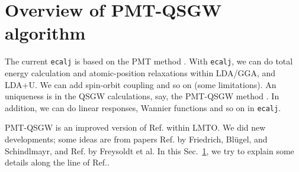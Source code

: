 \documentclass[a4paper,10pt,epsf,fleqn]{article}
\begin{document}


\newpage
\section{Overview of PMT-QSGW algorithm}
\label{sec:theory}
The current {\tt ecalj} is based on the PMT method
\cite{kotani2015pmt,kotani_linearized_2013,pmt1}.
With {\tt ecalj}, we can do total energy calculation and 
atomic-position relaxations within LDA/GGA, and LDA+U.
We can add spin-orbit coupling and so on (some limitations).
An uniqueness is in the QSGW calculations, say, the PMT-QSGW method
\cite{kotani_quasiparticle_2014}. 
In addition, we can do linear responses, Wannier functions and 
so on in {\tt ecalj}.

PMT-QSGW is an improved version of 
Ref.\cite{kotani_quasiparticle_2007} within LMTO.
We did new developments; some ideas are from papers
Ref.\cite{friedrich_efficient_2010} 
by Friedrich, Bl\"ugel, and Schindlmayr,
and Ref.\cite{Freysoldt2007} by Freysoldt et al.
In this Sec.~\ref{sec:theory}, we try to explain some details along
the line of Ref.\cite{kotani_quasiparticle_2014}.
\end{document}
